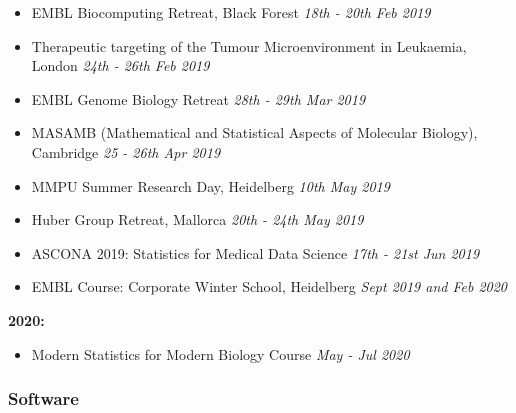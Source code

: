 \documentclass[11pt, a4paper, twosided]{book}
\begin{document}
    \begin{itemize}
      \item EMBL Biocomputing Retreat, Black Forest \textit{18th - 20th Feb 2019}
      \item Therapeutic targeting of the Tumour Microenvironment in Leukaemia, London
    \textit{24th - 26th Feb 2019}
      \item EMBL Genome Biology Retreat \textit{28th - 29th Mar 2019}
      \item MASAMB (Mathematical and Statistical Aspects of Molecular Biology),
    Cambridge \textit{25 - 26th Apr 2019}

      \item MMPU Summer Research Day, Heidelberg \textit{10th May 2019}
      \item Huber Group Retreat, Mallorca \textit{20th - 24th May 2019}
      \item ASCONA 2019: Statistics for Medical Data Science \textit{17th - 21st Jun 2019}
      \item EMBL Course: Corporate Winter School, Heidelberg \textit{Sept 2019 and Feb 2020}
    \end{itemize}
    \textbf{2020:}
    \begin{itemize}
      \item Modern Statistics for Modern Biology Course
    \textit{May - Jul 2020}
      
    \end{itemize}
    \hypertarget{software}{%
    \subsubsection*{Software}\label{software}}
\end{document}
